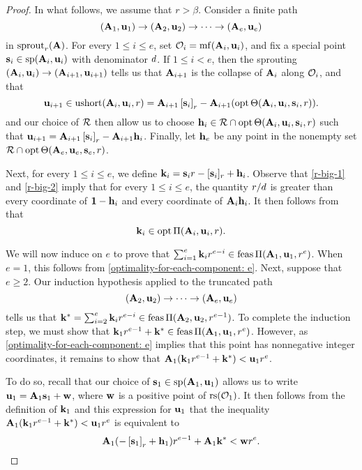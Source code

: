 \documentclass{amsart}
\begin{document}
\begin{proof}
    In what follows, we assume that $r > \beta$.
    Consider a finite path
    \[ (\mathbf{A}_1, \mathbf{u}_1) \to (\mathbf{A}_2, \mathbf{u}_2) \to \cdots \to (\mathbf{A}_e, \mathbf{u}_e) \]
    in $\operatorname{sprout}_r(\mathbf{A})$.
    For every $1 \leq i \leq e$, set $\mathcal{O}_i = \operatorname{mf}(\mathbf{A}_i, \mathbf{u}_i)$, and fix a special point $\mathbf{s}_i \in \operatorname{sp}(\mathbf{A}_i, \mathbf{u}_i)$ with denominator $d$.
    If $1 \leq i < e$, then the sprouting $(\mathbf{A}_i, \mathbf{u}_i) \to (\mathbf{A}_{i+1}, \mathbf{u}_{i+1})$ tells us that $\mathbf{A}_{i+1}$ is the collapse of $\mathbf{A}_i$ along $\mathcal{O}_i$, and that
    \[
       \mathbf{u}_{i+1} \in \operatorname{ushort}(\mathbf{A}_i, \mathbf{u}_i, r)= \mathbf{A}_{i+1} \left[ \mathbf{s}_i \right]_r - \mathbf{A}_{i+1}(\operatorname{opt} \Theta( \mathbf{A}_i, \mathbf{u}_i, \mathbf{s}_i, r)).
    \]
     and our choice of $\mathcal{R}$ then allow us to choose $\mathbf{h}_i \in \mathcal{R} \cap \operatorname{opt} \Theta ( \mathbf{A}_i, \mathbf{u}_i, \mathbf{s}_i, r)$ such that $\mathbf{u}_{i+1} = \mathbf{A}_{i+1} \left[ \mathbf{s}_i \right]_r - \mathbf{A}_{i+1} \mathbf{h}_i$.
    Finally, let $\mathbf{h}_e$ be any point in the nonempty set $\mathcal{R} \cap \operatorname{opt} \Theta ( \mathbf{A}_e, \mathbf{u}_e, \mathbf{s}_e, r)$.

    Next, for every $1 \leq i \leq e$,  we define $\mathbf{k}_i = \mathbf{s}_i r - [\mathbf{s}_i]_r + \mathbf{h}_i$.
    Observe that \eqref{r-big-1} and \eqref{r-big-2} imply that for every $1 \leq i \leq e$, the quantity $r/d$ is greater than every coordinate of $\mathbf{1}-\mathbf{h}_i$ and every coordinate of $\mathbf{A}_i \mathbf{h}_i$.
    It then follows from  that
    \begin{equation}
       \label{optimality-for-each-component: e}
       \mathbf{k}_i \in \operatorname{opt} \Pi(\mathbf{A}_i, \mathbf{u}_i,r).
    \end{equation}

    We will now induce on $e$ to prove that $\sum_{i=1}^e \mathbf{k}_i r^{e-i} \in \operatorname{feas}\Pi(\mathbf{A}_1, \mathbf{u}_1, r^e)$.
    When $e = 1$, this follows from \eqref{optimality-for-each-component: e}.
    Next, suppose that $e \geq 2$.
    Our induction hypothesis applied to the truncated path
    \[ (\mathbf{A}_2, \mathbf{u}_2) \to \cdots \to (\mathbf{A}_e, \mathbf{u}_e) \]
    tells us that $\mathbf{k}^{\ast} = \sum_{i=2}^e \mathbf{k}_i r^{e-i} \in \operatorname{feas} \Pi(\mathbf{A}_2, \mathbf{u}_2, r^{e-1})$.
    To complete the induction step, we must show that $\mathbf{k}_1 r^{e-1} + \mathbf{k}^{\ast} \in \operatorname{feas}\Pi(\mathbf{A}_1, \mathbf{u}_1, r^e)$.
    However, as \eqref{optimality-for-each-component: e} implies that this point has nonnegative integer coordinates, it remains to show that $\mathbf{A}_1 ( \mathbf{k}_1 r^{e-1} + \mathbf{k}^{\ast} ) < \mathbf{u}_1 r^e$.

    To do so, recall that our choice of $\mathbf{s}_1 \in \operatorname{sp}(\mathbf{A}_1, \mathbf{u}_1)$ allows us to write $\mathbf{u}_1 = \mathbf{A}_1 \mathbf{s}_1 + \mathbf{w}$, where $\mathbf{w}$ is a positive point of $\operatorname{rs}(\mathcal{O}_1)$.
    It then follows from the definition of $\mathbf{k}_1$ and this expression for $\mathbf{u}_1$ that the inequality $\mathbf{A}_1 ( \mathbf{k}_1 r^{e-1} + \mathbf{k}^{\ast} ) < \mathbf{u}_1 r^e$ is equivalent to
    \begin{equation}
       \label{target-inequality: e}
       \mathbf{A}_1( - \left[ \mathbf{s}_1 \right]_r + \mathbf{h}_1 ) r^{e-1} + \mathbf{A}_1\mathbf{k}^{\ast} < \mathbf{w} r^e.
    \end{equation}


\end{proof}
\end{document}
